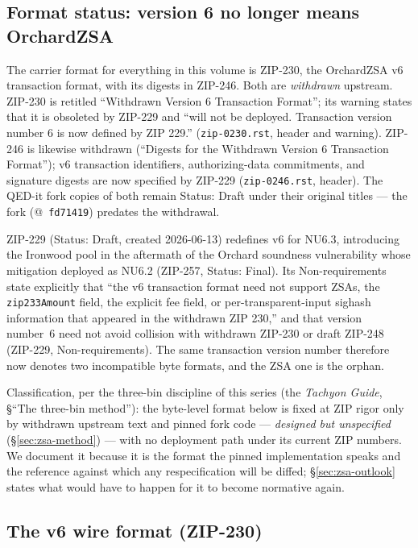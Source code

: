 \documentclass[11pt,a4paper]{article}
\theoremstyle{definition}
\begin{document}
\subsection{Format status: version 6 no longer means OrchardZSA}
\label{sec:zsa-format-status}

The carrier format for everything in this volume is ZIP-230, the OrchardZSA
v6 transaction format, with its digests in ZIP-246. Both are \emph{withdrawn}
upstream. ZIP-230 is retitled ``Withdrawn Version 6 Transaction Format''; its
warning states that it is obsoleted by ZIP-229 and ``will not be deployed.
Transaction version number 6 is now defined by ZIP 229.''
(\texttt{zip-0230.rst}, header and warning). ZIP-246 is likewise withdrawn
(``Digests for the Withdrawn Version 6 Transaction Format''); v6 transaction
identifiers, authorizing-data commitments, and signature digests are now
specified by ZIP-229 (\texttt{zip-0246.rst}, header). The QED-it fork copies
of both remain Status: Draft under their original titles --- the fork
(@~\texttt{fd71419}) predates the withdrawal.

ZIP-229 (Status: Draft, created 2026-06-13) redefines v6 for NU6.3,
introducing the Ironwood pool in the aftermath of the Orchard soundness
vulnerability whose mitigation deployed as NU6.2 (ZIP-257, Status: Final).
Its Non-requirements state explicitly that ``the v6 transaction format need
not support ZSAs, the \texttt{zip233Amount} field, the explicit fee field, or
per-transparent-input sighash information that appeared in the withdrawn
ZIP 230,'' and that version number~6 need not avoid collision with withdrawn
ZIP-230 or draft ZIP-248 (ZIP-229, Non-requirements). The same transaction
version number therefore now denotes two incompatible byte formats, and the
ZSA one is the orphan.

Classification, per the three-bin discipline of this series (the
\emph{Tachyon Guide}, \S``The three-bin method''): the byte-level format
below is fixed at ZIP rigor only by withdrawn upstream text and pinned
fork code --- \emph{designed but unspecified} (\S\ref{sec:zsa-method}) ---
with no deployment path under its current ZIP numbers. We document it because
it is the format the pinned implementation speaks and the reference against
which any respecification will be diffed; \S\ref{sec:zsa-outlook} states what
would have to happen for it to become normative again.

\subsection{The v6 wire format (ZIP-230)}\label{sec:zsa-v6}
\end{document}
